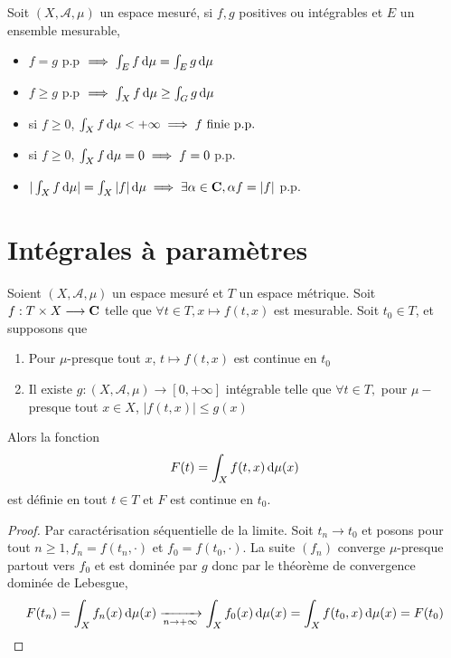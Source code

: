 \begin{lmm}
    Soit $(X, \mathcal  A, \mu)$ un espace mesuré, si  $f, g$ positives ou intégrables et $E$ un ensemble mesurable,  \begin{itemize}
        \item $f=g$ p.p  $\implies \int_Ef\mathop{}\!\mathrm d\mu=\int_Eg\mathop{}\!\mathrm d\mu$
        \item $f\geq g$ p.p $\implies \int_Xf\mathop{}\!\mathrm d\mu\geq \int_G g\mathop{}\!\mathrm d\mu$
        \item si $f\geq 0$, $\int_Xf\mathop{}\!\mathrm d\mu<+\infty \implies f \text{ finie p.p.}$
        \item si $f\geq 0$, $\int_Xf\mathop{}\!\mathrm d\mu=0\implies f=0$ p.p.
        \item $|\int_X f\mathop{}\!\mathrm d\mu|=\int_X|f|\mathop{}\!\mathrm d\mu \implies \exists  \alpha \in \mathbf C, \alpha f=|f|$ p.p.
    \end{itemize}
\end{lmm}

\section{Intégrales à paramètres}

\begin{thm}
    Soient $(X, \mathcal  A, \mu)$ un espace mesuré et $T$ un espace métrique. Soit  $f:T\times X \longrightarrow \mathbf C$ telle que
        $\forall  t \in  T, x \longmapsto f(t, x)$ est mesurable. Soit $t_0 \in  T$, et supposons que \begin{enumerate}
            \item Pour $\mu$-presque tout  $x$,  $t\longmapsto f(t, x)$ est continue en $t_0$
            \item Il existe  $g:(X, \mathcal A, \mu)\longrightarrow [0, +\infty]$ intégrable telle que $\forall  t \in  T, $ pour $\mu-$presque tout  $x \in  X$, $|f(t, x)|\leq g(x)$
        \end{enumerate}
        Alors la fonction \[F(t)=\int_Xf(t, x)\mathop{}\!\mathrm d \mu(x)\] est définie en tout $t \in  T$ et $F$ est continue en  $t_0$.
\end{thm}

\begin{proof}
    Par caractérisation séquentielle de la limite. Soit $t_n \longrightarrow t_0$ et posons pour tout $n\geq 1, f_n=f(t_n, \cdot)$ et $f_0=f(t_0, \cdot)$. La suite  $(f_n)$ converge  $\mu$-presque partout vers  $f_{0}$ et est dominée par $g$ donc par le théorème de convergence dominée de Lebesgue,  \[
        F(t_n)=\int_Xf_n(x)\mathop{}\!\mathrm d\mu(x) \xrightarrow[n\to+\infty]{}\int_X f_{0}(x)\mathop{}\!\mathrm d \mu(x)=\int_X f(t_0, x)\mathop{}\!\mathrm d \mu(x)=F(t_0)
    \] 
\end{proof}

